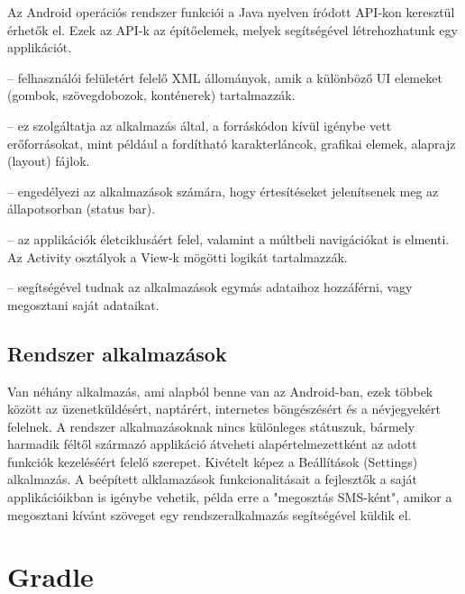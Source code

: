 Az Android operációs rendszer funkciói a Java nyelven íródott API-kon keresztül érhetők el. Ezek az API-k az építőelemek, melyek segítségével létrehozhatunk egy applikációt.

\begin{description}
	\setlength{\itemsep}{0.04mm}
	\item[View rendszer] -- felhasználói felületért felelő XML állományok, amik a különböző UI elemeket (gombok, szövegdobozok, konténerek) tartalmazzák.
	\item[Erőforráskezelő (Resource Manager)] -- ez szolgáltatja az alkalmazás által, a forráskódon kívül igénybe vett erőforrásokat, mint például a fordítható karakterláncok, grafikai elemek, alaprajz (layout) fájlok.
	\item[Értesítéskezelő (Notification Manager)] -- engedélyezi az alkalmazások számára, hogy értesítéseket jelenítsenek meg az állapotsorban (status bar).
	\item[Activity-kezelő] -- az applikációk életciklusáért felel, valamint a múltbeli navigációkat is elmenti. Az Activity osztályok a View-k mögötti logikát tartalmazzák.
	\item[Tartalom szolgáltató (Content Provider)] -- segítségével tudnak az alkalmazások egymás adataihoz hozzáférni, vagy megosztani saját adataikat.
\end{description}

\subsection{Rendszer alkalmazások}

Van néhány alkalmazás, ami alapból benne van az Android-ban, ezek többek között az üzenetküldésért, naptárért, internetes böngészésért és a névjegyekért felelnek. A rendszer alkalmazásoknak nincs különleges státuszuk, bármely harmadik féltől származó applikáció átveheti alapértelmezettként az adott funkciók kezeléséért felelő szerepet. Kivételt képez a Beállítások (Settings) alkalmazás. A beépített alklamazások funkcionalitásait a fejlesztők a saját applikációikban is igénybe vehetik, példa erre a "megosztás SMS-ként", amikor a megosztani kívánt szöveget egy rendszeralkalmazás segítségével küldik el.


\section{Gradle}\label{sec:ALAP:adatelem}

